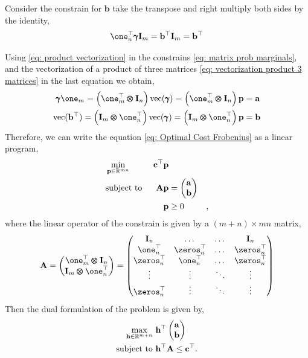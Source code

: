 Consider the constrain for $\mathbf{b}$ take the transpose and right multiply both sides by the identity,
\begin{align*}
	\one_n^\top\pmb{\gamma}\mathbf{I}_m=\mathbf{b}^\top\mathbf{I}_m=\mathbf{b}^\top
\end{align*}

Using \eqref{eq: product vectorization} in the constrains \eqref{eq: matrix prob marginals}, and the vectorization of a product of three matrices \eqref{eq: vectorization product 3 matrices} in the last equation we obtain, 
\begin{align}
	\pmb{\gamma}\one_m=\parentheses{\one_m^\top\pmb{\otimes}\mathbf{I}_n}\mathrm{vec}(\pmb{\gamma})=\parentheses{\one_m^\top\pmb{\otimes}\mathbf{I}_n}\mathbf{p}&=\mathbf{a}\\
	\mathrm{vec}(\mathbf{b}^\top)=\parentheses{\mathbf{I}_m\pmb{\otimes}\one_n^\top}\mathrm{vec}(\pmb{\gamma})=\parentheses{\mathbf{I}_m\pmb{\otimes}\one_n^\top}\mathbf{p}&=\mathbf{b}\label{eq: constrain deduction}
\end{align}
Therefore, we can write the equation  \ref{eq: Optimal Cost Frobenius} as a linear program, 
\begin{align}
	&\min_{\mathbf{p}\in\mathbb{R}^{mn}}\,&\mathbf{c}^\top \mathbf{p} &\\
	&\text{subject to }& \mathbf{Ap}&=\begin{pmatrix}
	\mathbf{a}\\\mathbf{b}
	\end{pmatrix} &\\
	& &\mathbf{p}&\geq 0 &,
\end{align}
where the linear operator of the constrain is given by a $(m+n)\times mn$ matrix,
\begin{equation}
	\mathbf{A}=\begin{pmatrix}
	\one_m^\top \pmb{\otimes} \mathbf{I}_{n}\\
	\mathbf{I}_{m
		}\pmb{\otimes} \one_n^\top 
	\end{pmatrix}=\begin{pmatrix}
	\mathbf{I}_n&\dots &\dots& \mathbf{I}_n\\
	\one_n^\top&\zeros_n^\top &\dots& \zeros_n^\top\\
	\zeros_n^\top&\one_n^\top &\dots& \zeros_n^\top\\
	\vdots&\vdots&\ddots& \vdots\\
	\zeros_n^\top&\vdots&\ddots& \vdots\\
	\end{pmatrix}
\end{equation}
Then the dual formulation of the problem is given by,
\begin{align}
	\max_{\mathbf{h}\in\mathbb{R}^{m+n}}\ &\mathbf{h}^\top\begin{pmatrix}
	\mathbf{a}\\\mathbf{b}
	\end{pmatrix}\\
	\text{subject to }& \mathbf{h}^\top\mathbf{A}\leq \mathbf{c}^\top.
\end{align}
